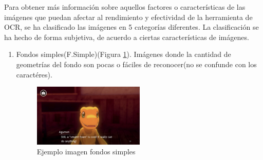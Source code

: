 Para obtener más información sobre aquellos factores o características de las imágenes que puedan afectar al rendimiento y efectividad de la herramienta de OCR, se ha clasificado las imágenes en 5 categorías diferentes. La clasificación se ha hecho de forma subjetiva, de acuerdo a ciertas características de imágenes.
\begin{enumerate}
	\item Fondos simples(F.Simple)(Figura \ref{fig:Fsimple}). Imágenes donde la cantidad de geometrías del fondo son pocas o fáciles de reconocer(no se confunde con los caractéres).
	\begin{figure}[H]
		\centering
		\includegraphics[width = 0.5\textwidth]{Imagenes/OCR/Simple.png}
		\caption{Ejemplo imagen fondos simples }
		\label{fig:Fsimple}
	\end{figure}
	

\end{enumerate}

